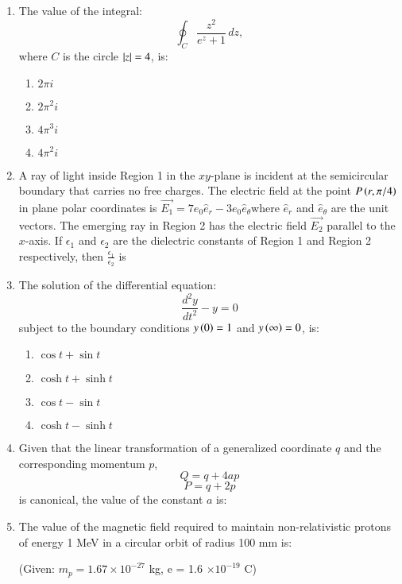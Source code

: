 \documentclass[journal,9pt,onecolumn]{IEEEtran}
\begin{document}
\begin{enumerate}
\item The value of the integral:$$\oint_C \frac{z^2}{e^z + 1} \, dz,$$
where $C$ is the circle $\left\vert z\right\vert = 4$, is:

\begin{multicols}{4}
\begin{enumerate}
    \item $2 \pi i$
    \item $2 \pi^2 i$
    \item $4 \pi^3 i$
    \item $4 \pi^2 i$
\end{enumerate}
\end{multicols}

\item A ray of light inside Region 1 in the $xy$-plane is incident at the semicircular boundary that carries no free charges. The electric field at the point $P\left(r, \pi/4\right)$ in plane polar coordinates is $\overrightarrow{E_1} = 7 e_0 \hat{e}_r - 3 e_0 \hat{e}_{\theta}$where $\hat{e}_r$ and $\hat{e}_{\theta}$ are the unit vectors. The emerging ray in Region 2 has the electric field $\overrightarrow{E_2}$ parallel to the $x$-axis. If $\epsilon_1$ and $\epsilon_2$ are the dielectric constants of Region 1 and Region 2 respectively, then $\frac{\epsilon_1}{\epsilon_2}$ is
\begin{center}
    
\end{center}

\item The solution of the differential equation: $$\frac{d^2 y}{dt^2} - y = 0$$subject to the boundary conditions $y\left(0\right) = 1$ and $y\left(\infty\right) = 0$, is:

\begin{multicols}{4}
\begin{enumerate}
    \item $\cos t + \sin t$
    \item $\cosh t + \sinh t$
    \item $\cos t - \sin t$
    \item $\cosh t - \sinh t$
\end{enumerate}
\end{multicols}


\item Given that the linear transformation of a generalized coordinate $q$ and the corresponding momentum $p$,  
$$
Q = q + 4a p
$$
$$
P = q + 2p
$$
is canonical, the value of the constant $a$ is:




    
\item The value of the magnetic field required to maintain non-relativistic protons of energy 1 MeV in a circular orbit of radius 100 mm is:  

(Given: $m_p = 1.67 \times 10^{-27}$ kg, e = 1.6 $\times 10^{-19}$ C)
\end{enumerate}
\end{document}
